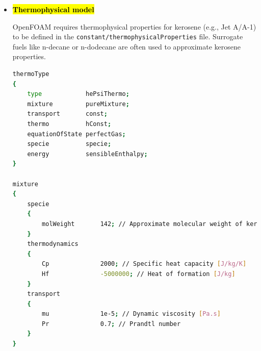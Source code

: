 \documentclass[12pt]{article}
\begin{document}
\begin{itemize}
%
    \item \hl{\textbf{Thermophysical model}}
    
    OpenFOAM requires thermophysical properties for kerosene (e.g., Jet A/A-1) to be defined in the \texttt{constant/thermophysicalProperties} file. Surrogate fuels like n-decane or n-dodecane are often used to approximate kerosene properties.
\begin{lstlisting}[language={bash}, caption={Thermophysical Properties in OpenFOAM.}]
thermoType
{
    type            hePsiThermo;
    mixture         pureMixture;
    transport       const;
    thermo          hConst;
    equationOfState perfectGas;
    specie          specie;
    energy          sensibleEnthalpy;
}

mixture
{
    specie
    {
        molWeight       142; // Approximate molecular weight of kerosene
    }
    thermodynamics
    {
        Cp              2000; // Specific heat capacity [J/kg/K]
        Hf              -5000000; // Heat of formation [J/kg]
    }
    transport
    {
        mu              1e-5; // Dynamic viscosity [Pa.s]
        Pr              0.7; // Prandtl number
    }
}
\end{lstlisting}


\end{itemize}
\end{document}
